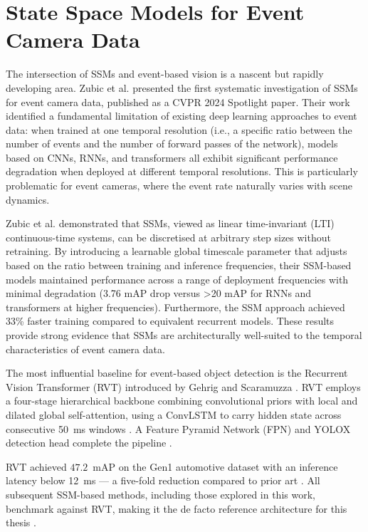\documentclass[11pt, a4paper]{report}
\begin{document}
\section{State Space Models for Event Camera Data}
The intersection of SSMs and event-based vision is a nascent but rapidly developing area. Zubic et al. \cite{zubic2024state} presented the first systematic investigation of SSMs for event camera data, published as a CVPR 2024 Spotlight paper. Their work identified a fundamental limitation of existing deep learning approaches to event data: when trained at one temporal resolution (i.e., a specific ratio between the number of events and the number of forward passes of the network), models based on CNNs, RNNs, and transformers all exhibit significant performance degradation when deployed at different temporal resolutions. This is particularly problematic for event cameras, where the event rate naturally varies with scene dynamics. 

Zubic et al. \cite{zubic2024state} demonstrated that SSMs, viewed as linear time-invariant (LTI) continuous-time systems, can be discretised at arbitrary step sizes without retraining. By introducing a learnable global timescale parameter that adjusts based on the ratio between training and inference frequencies, their SSM-based models maintained performance across a range of deployment frequencies with minimal degradation (3.76 mAP drop versus >20 mAP for RNNs and transformers at higher frequencies). Furthermore, the SSM approach achieved 33\% faster training compared to equivalent recurrent models. These results provide strong evidence that SSMs are architecturally well-suited to the temporal characteristics of event camera data. 

The most influential baseline for event-based object detection is the Recurrent Vision Transformer (RVT) introduced by Gehrig and Scaramuzza \cite{gehrig2023recurrent}. RVT employs a four-stage hierarchical backbone combining convolutional priors with local and dilated global self-attention, using a ConvLSTM to carry hidden state across consecutive 50~ms windows \cite{gehrig2023recurrent}. A Feature Pyramid Network (FPN) and YOLOX detection head complete the pipeline \cite{gehrig2023recurrent}. 

RVT achieved $47.2$~mAP on the Gen1 automotive dataset with an inference latency below 12~ms --- a five-fold reduction compared to prior art \cite{gehrig2023recurrent}. All subsequent SSM-based methods, including those explored in this work, benchmark against RVT, making it the de facto reference architecture for this thesis \cite{gehrig2023recurrent, zubic2024state, yang2025smamba}.
\end{document}
